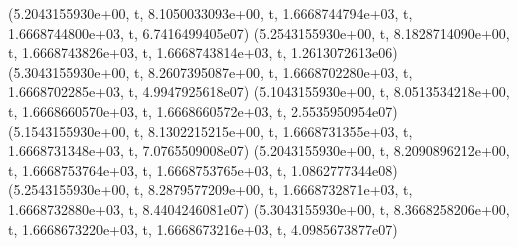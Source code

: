 \documentclass[letterpaper,10pt,english]{sphinxmanual}
\begin{document}
\begin{sphinxVerbatim}[commandchars=\\\{\}]
(\PYGZsq{}5.2043155930e+00\PYGZsq{}, \PYGZsq{}\PYGZbs{}t\PYGZsq{}, \PYGZsq{}8.1050033093e+00\PYGZsq{}, \PYGZsq{}\PYGZbs{}t\PYGZsq{}, \PYGZsq{}\PYGZhy{}1.6668744794e+03\PYGZsq{}, \PYGZsq{}\PYGZbs{}t\PYGZsq{}, \PYGZsq{}\PYGZhy{}1.6668744800e+03\PYGZsq{}, \PYGZsq{}\PYGZbs{}t\PYGZsq{}, \PYGZsq{}6.7416499405e\PYGZhy{}07\PYGZsq{})
(\PYGZsq{}5.2543155930e+00\PYGZsq{}, \PYGZsq{}\PYGZbs{}t\PYGZsq{}, \PYGZsq{}8.1828714090e+00\PYGZsq{}, \PYGZsq{}\PYGZbs{}t\PYGZsq{}, \PYGZsq{}\PYGZhy{}1.6668743826e+03\PYGZsq{}, \PYGZsq{}\PYGZbs{}t\PYGZsq{}, \PYGZsq{}\PYGZhy{}1.6668743814e+03\PYGZsq{}, \PYGZsq{}\PYGZbs{}t\PYGZsq{}, \PYGZsq{}\PYGZhy{}1.2613072613e\PYGZhy{}06\PYGZsq{})
(\PYGZsq{}5.3043155930e+00\PYGZsq{}, \PYGZsq{}\PYGZbs{}t\PYGZsq{}, \PYGZsq{}8.2607395087e+00\PYGZsq{}, \PYGZsq{}\PYGZbs{}t\PYGZsq{}, \PYGZsq{}\PYGZhy{}1.6668702280e+03\PYGZsq{}, \PYGZsq{}\PYGZbs{}t\PYGZsq{}, \PYGZsq{}\PYGZhy{}1.6668702285e+03\PYGZsq{}, \PYGZsq{}\PYGZbs{}t\PYGZsq{}, \PYGZsq{}4.9947925618e\PYGZhy{}07\PYGZsq{})
(\PYGZsq{}5.1043155930e+00\PYGZsq{}, \PYGZsq{}\PYGZbs{}t\PYGZsq{}, \PYGZsq{}8.0513534218e+00\PYGZsq{}, \PYGZsq{}\PYGZbs{}t\PYGZsq{}, \PYGZsq{}\PYGZhy{}1.6668660570e+03\PYGZsq{}, \PYGZsq{}\PYGZbs{}t\PYGZsq{}, \PYGZsq{}\PYGZhy{}1.6668660572e+03\PYGZsq{}, \PYGZsq{}\PYGZbs{}t\PYGZsq{}, \PYGZsq{}2.5535950954e\PYGZhy{}07\PYGZsq{})
(\PYGZsq{}5.1543155930e+00\PYGZsq{}, \PYGZsq{}\PYGZbs{}t\PYGZsq{}, \PYGZsq{}8.1302215215e+00\PYGZsq{}, \PYGZsq{}\PYGZbs{}t\PYGZsq{}, \PYGZsq{}\PYGZhy{}1.6668731355e+03\PYGZsq{}, \PYGZsq{}\PYGZbs{}t\PYGZsq{}, \PYGZsq{}\PYGZhy{}1.6668731348e+03\PYGZsq{}, \PYGZsq{}\PYGZbs{}t\PYGZsq{}, \PYGZsq{}\PYGZhy{}7.0765509008e\PYGZhy{}07\PYGZsq{})
(\PYGZsq{}5.2043155930e+00\PYGZsq{}, \PYGZsq{}\PYGZbs{}t\PYGZsq{}, \PYGZsq{}8.2090896212e+00\PYGZsq{}, \PYGZsq{}\PYGZbs{}t\PYGZsq{}, \PYGZsq{}\PYGZhy{}1.6668753764e+03\PYGZsq{}, \PYGZsq{}\PYGZbs{}t\PYGZsq{}, \PYGZsq{}\PYGZhy{}1.6668753765e+03\PYGZsq{}, \PYGZsq{}\PYGZbs{}t\PYGZsq{}, \PYGZsq{}1.0862777344e\PYGZhy{}08\PYGZsq{})
(\PYGZsq{}5.2543155930e+00\PYGZsq{}, \PYGZsq{}\PYGZbs{}t\PYGZsq{}, \PYGZsq{}8.2879577209e+00\PYGZsq{}, \PYGZsq{}\PYGZbs{}t\PYGZsq{}, \PYGZsq{}\PYGZhy{}1.6668732871e+03\PYGZsq{}, \PYGZsq{}\PYGZbs{}t\PYGZsq{}, \PYGZsq{}\PYGZhy{}1.6668732880e+03\PYGZsq{}, \PYGZsq{}\PYGZbs{}t\PYGZsq{}, \PYGZsq{}8.4404246081e\PYGZhy{}07\PYGZsq{})
(\PYGZsq{}5.3043155930e+00\PYGZsq{}, \PYGZsq{}\PYGZbs{}t\PYGZsq{}, \PYGZsq{}8.3668258206e+00\PYGZsq{}, \PYGZsq{}\PYGZbs{}t\PYGZsq{}, \PYGZsq{}\PYGZhy{}1.6668673220e+03\PYGZsq{}, \PYGZsq{}\PYGZbs{}t\PYGZsq{}, \PYGZsq{}\PYGZhy{}1.6668673216e+03\PYGZsq{}, \PYGZsq{}\PYGZbs{}t\PYGZsq{}, \PYGZsq{}\PYGZhy{}4.0985673877e\PYGZhy{}07\PYGZsq{})

\end{sphinxVerbatim}
\end{document}
